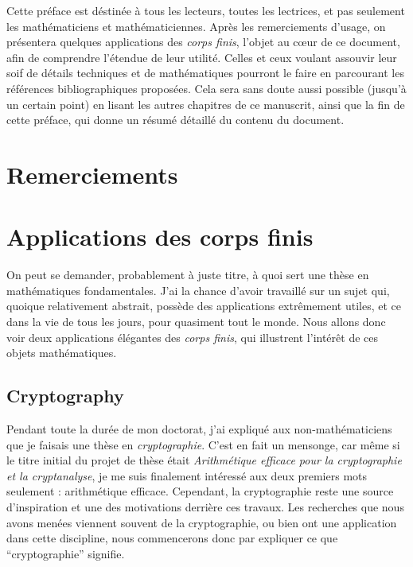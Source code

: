 Cette préface est déstinée à tous les lecteurs, toutes les lectrices, et pas
seulement les mathématiciens et mathématiciennes. Après les remerciements
d'usage, on présentera quelques applications des \emph{corps finis}, l'objet au
cœur de ce document, afin de comprendre l'étendue de leur utilité. Celles et ceux
voulant assouvir leur soif de détails techniques et de mathématiques
pourront le faire en parcourant les références bibliographiques proposées. Cela
sera sans doute aussi possible (jusqu'à un certain point) en lisant les autres
chapitres de ce manuscrit, ainsi que la fin de cette préface, qui donne un
résumé détaillé du contenu du document.

\minitoc
%
\clearpage

\section*{Remerciements}

\clearpage
\section*{Applications des corps finis}

On peut se demander, probablement à juste titre, à quoi sert une thèse en
mathématiques fondamentales. J'ai la chance d'avoir travaillé sur un sujet qui,
quoique relativement abstrait, possède des applications extrêmement utiles, et
ce dans la vie de tous les jours, pour quasiment tout le monde. Nous allons donc
voir deux applications élégantes des \emph{corps finis}, qui illustrent
l'intérêt de ces objets mathématiques.

\subsection*{Cryptography}
\label{sec:crypto}

Pendant toute la durée de mon doctorat, j'ai expliqué aux non-mathématiciens que
je faisais une thèse en \emph{cryptographie}. C'est en fait un mensonge, car
même si le titre initial du projet de thèse était \emph{Arithmétique efficace
pour la cryptographie et la cryptanalyse}, je me suis finalement intéressé
aux deux premiers mots seulement : arithmétique efficace. Cependant, la
cryptographie reste une source d'inspiration et une des motivations derrière ces
travaux. Les recherches que nous avons menées viennent souvent de la
cryptographie, ou bien ont une application dans cette discipline, nous
commencerons donc par expliquer ce que ``cryptographie'' signifie.

